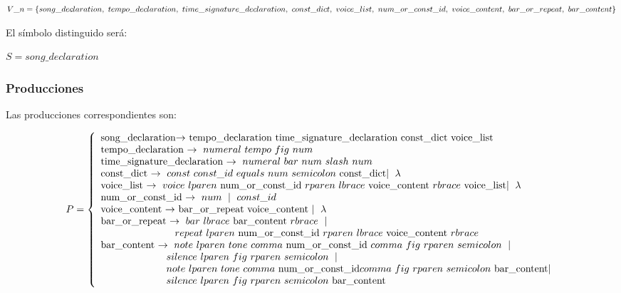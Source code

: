 \documentclass[a4paper, 10pt, twoside]{article}
\begin{document}
$V\_n = \{song\_declaration,\ tempo\_declaration,\ time\_signature\_declaration,\ const\_dict,\ voice\_list,\ num\_or\_const\_id,\ voice\_content,\\ \ bar\_or\_repeat,\ bar\_content\}$

El símbolo distinguido será:

$S = song\_declaration$

\subsubsection{Producciones}

Las producciones correspondientes son:

\begin{equation*}
  P = \left\lbrace
  \begin{array}{l}
      $song\_declaration$ \rightarrow\  $tempo\_declaration\ time\_signature\_declaration\ const\_dict\ voice\_list$ \\

  $tempo\_declaration$\ \rightarrow\ numeral\ tempo\ fig\ num\\

  $time\_signature\_declaration$\ \rightarrow\ numeral\ bar\ num\ slash\ num\\

  $const\_dict$\ \rightarrow\ const\ const\_id\ equals\ num\ semicolon\ $const\_dict$ \mid\ \lambda\\

  $voice\_list$\ \rightarrow\ voice\ lparen\ $num\_or\_const\_id$\ rparen\ lbrace\ $voice\_content$\ rbrace\ $voice\_list$ \mid\ \lambda\\

  $num\_or\_const\_id$\ \rightarrow\ num\ \mid\ const\_id\\

  $voice\_content$\ \rightarrow\ $bar\_or\_repeat\ voice\_content$\ \mid\ \lambda\\

  $bar\_or\_repeat$\ \rightarrow\ bar\ lbrace\ $bar\_content$\ rbrace\ \mid\ 
 \\ \-\hspace{2.5cm}\ repeat\ lparen\ $num\_or\_const\_id$\ rparen\ lbrace\ $voice\_content$\ rbrace\\

  $bar\_content$\ \rightarrow\ note\ lparen\ tone\ comma\ $num\_or\_const\_id$\ comma\ fig\ rparen\ semicolon\ \mid\ 
 \\ \-\hspace{2.2cm}\ silence\ lparen\ fig\ rparen\ semicolon\ \mid
 \\ \-\hspace{2.2cm}\ note\ lparen\ tone\ comma\ $num\_or\_const\_id$ comma\ fig\ rparen\ semicolon\ $bar\_content$\mid
 \\ \-\hspace{2.2cm}\ silence\ lparen\ fig\ rparen\ semicolon\ $bar\_content$

  \end{array}
  \right.
\end{equation*}
\end{document}

